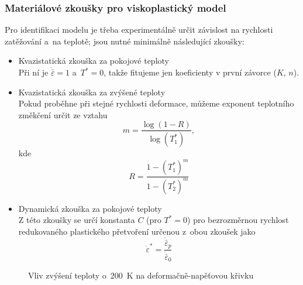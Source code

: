 \subsubsection{Materiálové zkoušky pro viskoplastický model}
Pro identifikaci modelu je třeba experimentálně určit závislost na rychlosti zatěžování a~na teplotě; jsou nutné minimálně následující zkoušky:
\begin{itemize}
	\item Kvazistatická zkouška za pokojové teploty\\
	Při ní je $\dot{\bar{\varepsilon}} = 1$ a~$T^* = 0$, takže fitujeme jen koeficienty v první závorce ($K$, $n$).
	\item Kvazistatická zkouška za zvýšené teploty\\
	Pokud proběhne při stejné rychlosti deformace, můžeme exponent 	teplotního změkčení určit ze vztahu
	\begin{equation}
		m = \frac{\log(1-R)}{\log(T^*_1)},
	\end{equation}
	kde
	\begin{equation*}
		R = \frac{1-(T^*_1)^m}{1-(T^*_2)^m}
	\end{equation*}
	\item Dynamická zkouška za pokojové teploty\\
	Z této zkoušky se určí konstanta $C$ (pro $T^* = 0$) pro bezrozměrnou rychlost redukovaného plastického přetvoření určenou z~obou zkoušek jako
	\begin{equation}
		\dot{\varepsilon}^* = \frac{\dot{\bar{\varepsilon}}_p}{\dot{\bar{\varepsilon}}_0}
	\end{equation}
\end{itemize}

\begin{figure}
	\label{fig:vliv-zvyseni-teploty-johnsoon-cook}
	\centering
	\caption{Vliv zvýšení teploty o~\SI{200}{\kelvin} na deformačně-napěťovou křivku}
\end{figure}
	